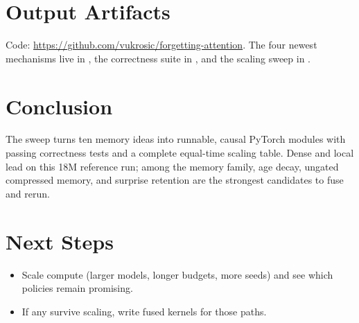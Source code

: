 \documentclass[10pt]{article}
\begin{document}
\section{Output Artifacts}

Code: \url{https://github.com/vukrosic/forgetting-attention}. The four
newest mechanisms live in , the
correctness suite in , and the
scaling sweep in .

\section{Conclusion}

The sweep turns ten memory ideas into runnable, causal PyTorch modules
with passing correctness tests and a complete equal-time scaling table.
Dense and local lead on this 18M reference run; among the memory family,
age decay, ungated compressed memory, and surprise retention are the
strongest candidates to fuse and rerun.

\section{Next Steps}

\begin{itemize}
\item Scale compute (larger models, longer budgets, more seeds) and see
which policies remain promising.
\item If any survive scaling, write fused kernels for those paths.
\end{itemize}
\end{document}
